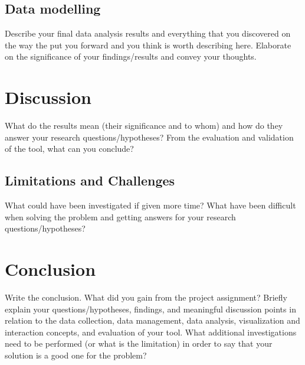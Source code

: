 

\subsection{Data modelling}
\label{sec:data}
Describe your final data analysis results and everything that you discovered on the way the put you forward and you think is worth describing here.
Elaborate on the significance of your findings/results and convey your thoughts. 


\section{Discussion}
\label{chap:discussion}
What do the results mean (their significance and to whom) and how do they answer your research questions/hypotheses? 
From the evaluation and validation of the tool, what can you conclude? 

\subsection{Limitations and Challenges}
\label{sec:limitation}
What could have been investigated if given more time? What have been difficult when solving the problem and getting answers for your research questions/hypotheses?

\section{Conclusion}
\label{chap:conclusion}
Write the conclusion. What did you gain from the project assignment? Briefly explain your questions/hypotheses, findings, and meaningful discussion points in relation to the data collection, data management, data analysis, visualization and interaction concepts, and evaluation of your tool.
What additional investigations need to be performed (or what is the limitation) in order to say that your solution is a good one for the problem? 

